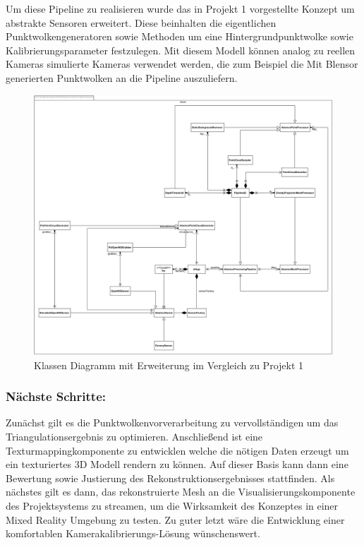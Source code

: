 Um diese Pipeline zu realisieren wurde das in Projekt 1 vorgestellte Konzept um 
abstrakte Sensoren erweitert. Diese beinhalten die eigentlichen 
Punktwolkengeneratoren sowie Methoden um eine Hintergrundpunktwolke sowie 
Kalibrierungsparameter festzulegen. Mit diesem Modell können analog zu reellen 
Kameras simulierte Kameras verwendet werden, die zum Beispiel die Mit Blensor 
generierten Punktwolken an die Pipeline auszuliefern.

\begin{figure}[H]
	\centering
	\includegraphics[width=\textwidth]{figs/class_diagram}
	\caption{Klassen Diagramm mit Erweiterung im Vergleich zu Projekt 1}
	\label{fig:classdiag}
\end{figure}



\subsubsection{Nächste Schritte: } 
Zunächst gilt es die Punktwolkenvorverarbeitung zu 
vervollständigen um das Triangulationsergebnis zu optimieren. Anschließend ist 
eine Texturmappingkomponente zu entwicklen welche die nötigen Daten erzeugt um 
ein texturiertes 3D Modell rendern zu können. Auf dieser Basis kann dann eine 
Bewertung sowie Justierung des Rekonstruktionsergebnisses stattfinden. Als 
nächstes gilt es dann, das rekonstruierte Mesh an die Visualisierungskomponente 
des Projektsystems zu streamen, um die Wirksamkeit des Konzeptes in einer Mixed 
Reality Umgebung zu testen. Zu guter letzt wäre die Entwicklung einer komfortablen 
Kamerakalibrierungs-Lösung wünschenswert.

